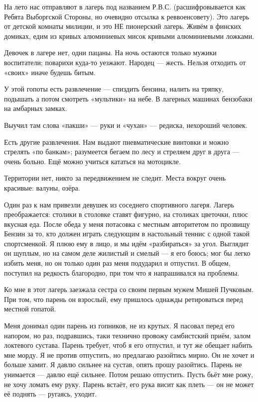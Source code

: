 \documentclass{book}
\begin{document}
На лето нас отправляют в лагерь под названием Р.В.С. (расшифровывается как Ребята Выборгской Стороны, но очевидно отсылка к реввоенсовету).
Это лагерь от детской комнаты милиции,
и это НЕ пионерский лагерь.
Живём в финских домиках, 
едим из кривых алюминиевых мисок кривыми алюминиевыми ложками.

Девочек в лагере нет, одни пацаны.
На ночь остаются только мужики воспитатели;
поварихи куда-то уезжают.
Народец --- жесть.
Нельзя отходить от «своих» иначе будешь битым.

У этой гопоты есть развлечение --- спиздить бензина, налить на тряпку, подышать а потом смотреть «мультики» на небе.
В лагерных машинах бензобаки на амбарных замках.

Выучил там слова «пакши» --- руки и «чухан» --- редиска, нехороший человек.

Есть другие развлечения.
Нам выдают пневматические винтовки и можно стрелять «по банкам»;
разумеется бегаем по лесу и стреляем друг в друга --- очень больно.
Ещё можно учиться кататься на мотоцикле.

Территории нет, никто за передвижением не следит.
Места вокруг очень красивые: валуны, озёра.

Один раз к нам привезли девушек из соседнего спортивного лагеря.
Лагерь преображается: столики в столовке ставят фигурно, на столиках цветочки, плюс вкусная еда.
После обеда у меня потасовка с местным авторитетом по прозвищу Бензин за то, кто должен играть следующим в настольный теннис с одной такой спортсменкой.
Я плюю ему в лицо, и мы идём «разбираться» за угол.
Выглядит он щуплым, но на самом деле жилистый и смелый --- я его боюсь;
мог бы легко избить меня, но он только один раз меня подударил и отпустил.
В общем, поступил на редкость благородно, при том что я напрашивался на проблемы.

Ко мне в этот лагерь заезжала сестра со своим первым мужем Мишей Пучковым.
При том, что парень он взрослый, ему пришлось однажды ретироваться перед местной гопатой.

Меня донимал один парень из гопников, не из крутых.
Я пасовал перед его напором, но раз, подравшись, таки технично провожу самбистский приём, залом локтевого сустава. 
Парень требует, чтоб я его отпустил, и тут же обещает набить мне морду.
Я не против отпустить, но предлагаю разойтись мирно.
Он не хочет и больше хамит.
Я давлю сильнее на сустав, опять прошу разойтись.
Парень не унимается --- давлю ещё сильнее.
Потом решаю отпустить.
Пусть бьёт мне рожу, не хочу ломать ему руку.
Парень встаёт, его рука висит как плеть --- он не может её поднять --- ругаясь, уходит.
\end{document}
